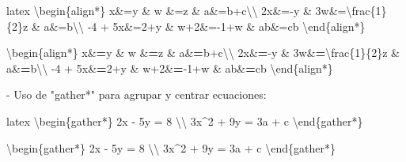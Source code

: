 \documentclass[11pt,a4paper,oneside,]{article}
\newenvironment{Shaded}{\begin{snugshade}}{\end{snugshade}}
\newcommand{\AttributeTok}[1]{\textcolor[rgb]{0.77,0.63,0.00}{#1}}
\newcommand{\DecValTok}[1]{\textcolor[rgb]{0.00,0.00,0.81}{#1}}
\newcommand{\ErrorTok}[1]{\textcolor[rgb]{0.64,0.00,0.00}{\textbf{#1}}}
\newcommand{\NormalTok}[1]{#1}
\newcommand{\OtherTok}[1]{\textcolor[rgb]{0.56,0.35,0.01}{#1}}
\newcommand{\SpecialCharTok}[1]{\textcolor[rgb]{0.00,0.00,0.00}{#1}}
\newcommand{\StringTok}[1]{\textcolor[rgb]{0.31,0.60,0.02}{#1}}
\numberwithin{dummy}{section}
\theoremstyle{ocrenumbox}
\theoremstyle{blacknumex}
\theoremstyle{blacknumbox}
\theoremstyle{ocrenum}
\theoremstyle{ocrenum}
\begin{document}
\begin{Shaded}
\begin{Highlighting}[numbers=left,,firstnumber=1101,]
\StringTok{\textasciigrave{}\textasciigrave{}\textasciigrave{}}\AttributeTok{latex}
\SpecialCharTok{\textbackslash{}b}\AttributeTok{egin\{align*\}}
\AttributeTok{x\&=y           \&  w \&=z              \&  a\&=b+c}\SpecialCharTok{\textbackslash{}\textbackslash{}}
\AttributeTok{2x\&={-}y         \&  3w\&=}\SpecialCharTok{\textbackslash{}f}\AttributeTok{rac\{1\}\{2\}z   \&  a\&=b}\SpecialCharTok{\textbackslash{}\textbackslash{}}
\AttributeTok{{-}4 + 5x\&=2+y   \&  w+2\&={-}1+w          \&  ab\&=cb}
\SpecialCharTok{\textbackslash{}e}\AttributeTok{nd\{align*\}}
\StringTok{\textasciigrave{}\textasciigrave{}\textasciigrave{}}

\NormalTok{\textbackslash{}begin\{align}\SpecialCharTok{*}\NormalTok{\}}
\NormalTok{x}\SpecialCharTok{\&}\ErrorTok{=}\NormalTok{y           }\SpecialCharTok{\&}\NormalTok{  w }\SpecialCharTok{\&}\ErrorTok{=}\NormalTok{z              }\SpecialCharTok{\&}\NormalTok{  a}\SpecialCharTok{\&}\ErrorTok{=}\NormalTok{b}\SpecialCharTok{+}\NormalTok{c\textbackslash{}\textbackslash{}}
\NormalTok{2x}\SpecialCharTok{\&}\ErrorTok{=}\SpecialCharTok{{-}}\NormalTok{y         }\SpecialCharTok{\&}\NormalTok{  3w}\SpecialCharTok{\&}\ErrorTok{=}\NormalTok{\textbackslash{}frac\{}\DecValTok{1}\NormalTok{\}\{}\DecValTok{2}\NormalTok{\}z   }\SpecialCharTok{\&}\NormalTok{  a}\SpecialCharTok{\&}\ErrorTok{=}\NormalTok{b\textbackslash{}\textbackslash{}}
\SpecialCharTok{{-}}\DecValTok{4} \SpecialCharTok{+}\NormalTok{ 5x}\SpecialCharTok{\&}\ErrorTok{=}\DecValTok{2}\SpecialCharTok{+}\NormalTok{y   }\SpecialCharTok{\&}\NormalTok{  w}\SpecialCharTok{+}\DecValTok{2}\SpecialCharTok{\&}\ErrorTok{=}\SpecialCharTok{{-}}\DecValTok{1}\SpecialCharTok{+}\NormalTok{w          }\SpecialCharTok{\&}\NormalTok{  ab}\SpecialCharTok{\&}\ErrorTok{=}\NormalTok{cb}
\NormalTok{\textbackslash{}end\{align}\SpecialCharTok{*}\NormalTok{\}}

\SpecialCharTok{{-}}\NormalTok{ Uso de }\StringTok{"\textasciigrave{}gather*\textasciigrave{}"}\NormalTok{ para agrupar y centrar ecuaciones}\SpecialCharTok{:}

\StringTok{\textasciigrave{}\textasciigrave{}\textasciigrave{}}\AttributeTok{latex}
\SpecialCharTok{\textbackslash{}b}\AttributeTok{egin\{gather*\} }
\AttributeTok{2x {-} 5y =  8 }\SpecialCharTok{\textbackslash{}\textbackslash{}}\AttributeTok{ }
\AttributeTok{3x\^{}2 + 9y =  3a + c}
\SpecialCharTok{\textbackslash{}e}\AttributeTok{nd\{gather*\}}
\StringTok{\textasciigrave{}\textasciigrave{}\textasciigrave{}}

\NormalTok{\textbackslash{}begin\{gather}\SpecialCharTok{*}\NormalTok{\} }
\NormalTok{2x }\SpecialCharTok{{-}}\NormalTok{ 5y }\OtherTok{=}  \DecValTok{8}\NormalTok{ \textbackslash{}\textbackslash{} }
\NormalTok{3x}\SpecialCharTok{\^{}}\DecValTok{2} \SpecialCharTok{+}\NormalTok{ 9y }\OtherTok{=}\NormalTok{  3a }\SpecialCharTok{+}\NormalTok{ c}
\NormalTok{\textbackslash{}end\{gather}\SpecialCharTok{*}\NormalTok{\}}





\end{Highlighting}
\end{Shaded}
\end{document}
